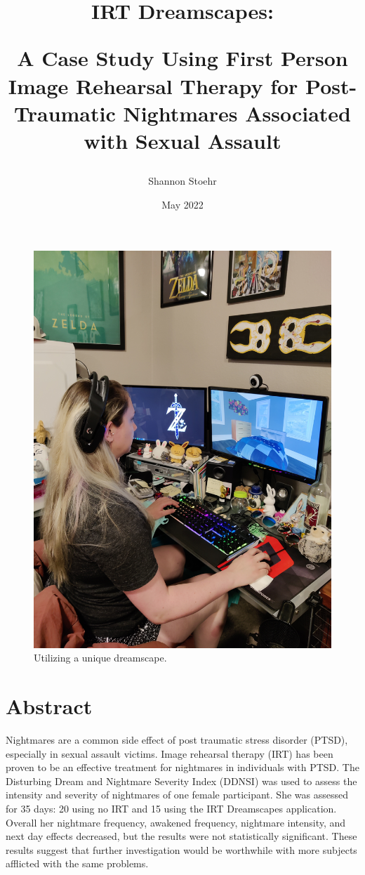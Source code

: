 \documentclass{article}
\title{IRT Dreamscapes:

A Case Study Using First Person Image Rehearsal Therapy for Post-Traumatic Nightmares Associated with Sexual Assault}
\author{Shannon Stoehr}
\date{May 2022}
\begin{document}
\maketitle

\begin{figure}[htbp]
    \centering
    \includegraphics[width=1\textwidth]{images/irt_exp.jpg}
    \caption{Utilizing a unique dreamscape.}
\end{figure}

\section*{Abstract}

Nightmares are a common side effect of post traumatic stress disorder (PTSD), especially in sexual assault victims. Image rehearsal therapy (IRT) has been proven to be an effective treatment for nightmares in individuals with PTSD. The Disturbing Dream and Nightmare Severity Index (DDNSI) was used to assess the intensity and severity of nightmares of one female participant. She was assessed for 35 days: 20 using no IRT and 15 using the IRT Dreamscapes application. Overall her nightmare frequency, awakened frequency, nightmare intensity, and next day effects decreased, but the results were not statistically significant. These results suggest that further investigation would be worthwhile with more subjects afflicted with the same problems.
\end{document}
